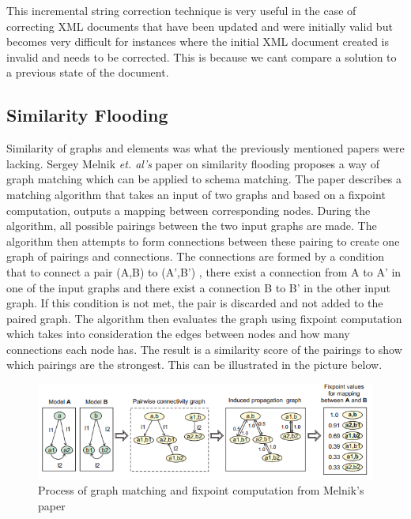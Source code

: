 \documentclass{report}
\begin{document}
This incremental string correction technique is very useful in the case of correcting XML documents that have been updated and were initially valid but becomes very difficult for instances where the initial XML document created is invalid and needs to be corrected. This is because we cant compare a solution to a previous state of the document. 

 
\subsection{Similarity Flooding}

Similarity of graphs and elements was what the previously mentioned papers were lacking. Sergey Melnik \textit{et. al's} paper \cite{melnik2002similarity} on similarity flooding proposes a way of graph matching which can be applied to schema matching. The paper describes a matching algorithm that takes an input of two graphs and based on a fixpoint computation, outputs a mapping between corresponding nodes. During the algorithm, all possible pairings between the two input graphs are made. The algorithm then attempts to form connections between these pairing to create one graph of pairings and connections. The connections are formed by a condition that to connect a pair (A,B) to (A',B') , there exist a connection from A to A' in one of the input graphs and there exist a connection B to B' in the other input graph. If this condition is not met, the pair is discarded and not added to the paired graph. The algorithm then evaluates the graph using fixpoint computation which takes into consideration the edges between nodes and how many connections each node has. The result is a similarity score of the pairings to show which pairings are the strongest. This can be illustrated in the picture below.

\begin{figure}[H]
\centering
\includegraphics[width=6in]{similarityfloodinggraph.png}%
\caption{Process of graph matching and fixpoint computation from Melnik's paper \cite{melnik2002similarity}}%
\label{fig:simfloodgraph}%
\end{figure}
\end{document}
